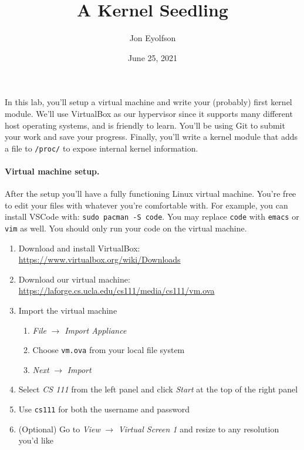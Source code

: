 

\title{A Kernel Seedling}
\author{Jon Eyolfson}
\date{June 25, 2021}



\maketitle

In this lab, you'll setup a virtual machine and write your (probably) first
kernel module.
We'll use VirtualBox as our hypervisor since it supports many different host
operating systems, and is friendly to learn.
You'll be using Git to submit your work and save your progress.
Finally, you'll write a kernel module that adds a file to \lstinline|/proc/|
to expose internal kernel information.

\paragraph{Virtual machine setup.}

After the setup you'll have a fully functioning Linux virtual machine.
You're free to edit your files with whatever you're comfortable with.
For example, you can install VSCode with: \texttt{sudo pacman -S code}.
You may replace \texttt{code} with \texttt{emacs} or \texttt{vim} as well.
You should only run your code on the virtual machine.

\begin{enumerate}
  \item Download and install VirtualBox:
        \url{https://www.virtualbox.org/wiki/Downloads}
  \item Download our virtual machine:
        \url{https://laforge.cs.ucla.edu/cs111/media/cs111/vm.ova}
  \item Import the virtual machine
    \begin{enumerate}
      \item \textit{File} $\rightarrow$ \textit{Import Appliance}
      \item Choose \lstinline|vm.ova| from your local file system
      \item \textit{Next} $\rightarrow$ \textit{Import}
    \end{enumerate}
  \item Select \textit{CS 111} from the left panel and click \textit{Start} at
        the top of the right panel
  \item Use \lstinline|cs111| for both the username and password
  \item (Optional) Go to \textit{View} $\rightarrow$ \textit{Virtual Screen 1}
        and resize to any resolution you'd like
\end{enumerate}


